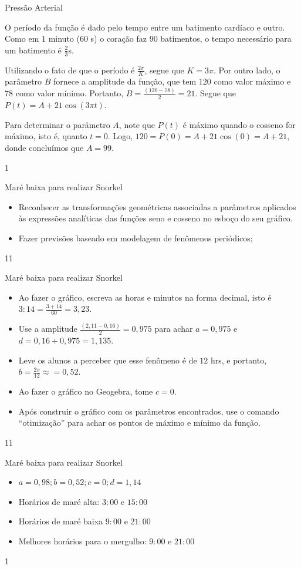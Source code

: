 \clearpage
\def\currentcolor{session2}
\marginpar{\vspace{.5em}}
\begin{answer}{Pressão Arterial}
{
O período da função é dado pelo tempo entre um batimento cardíaco e outro. Como em $1$ minuto ($60$ s) o coração faz $90$ batimentos, o tempo necessário para um batimento é $\frac{2}{3}$s. 

Utilizando o fato de que o período é $\frac{2\pi}{K}$, segue que $K = 3\pi$. Por outro lado, o parâmetro $B$ fornece a amplitude da função, que tem $120$ como valor máximo e $78$ como valor mínimo. Portanto, $B =\frac{(120-78)}{2} = 21$. Segue que $P(t) = A + 21\cos(3\pi t)$.

Para determinar o parâmetro $A$, note que $P(t)$ é máximo quando o cosseno for máximo, isto é, quanto $t = 0$. Logo, $120 = P(0) = A + 21\cos(0) = A + 21$, donde concluímos que $A = 99$.
}{1}
\end{answer}
\begin{objectives}{Maré baixa para realizar Snorkel}
{
\begin{itemize}
\item  Reconhecer as transformações geométricas associadas a
parâmetros aplicados às expressões analíticas das funções
seno e cosseno no esboço do seu gráfico.
\item Fazer previsões baseado em modelagem de fenômenos
periódicos;
\end{itemize}
}{1}{1}
\end{objectives}
\begin{sugestions}{Maré baixa para realizar Snorkel}
{
\begin{itemize}
\item Ao fazer o gráfico, escreva as horas e minutos na forma decimal, isto é $3:14=\frac{3+14}{60}=3{,}23$.
\item Use a amplitude $\frac{(2{,}11-0{,}16)}{2}=0{,}975$ para achar $a=0{,}975$ e $d=0{,}16+0{,}975=1{,}135$.
\item Leve os alunos a perceber que esse fenômeno é de $12$ hrs, e
portanto, $b=\frac{2\pi}{12}\approx=0{,}52$.
\item Ao fazer o gráfico no Geogebra, tome $c=0$.
\item Após construir o gráfico com os parâmetros encontrados, use o comando “otimização”{} para achar os pontos de máximo e mínimo da função.
\end{itemize}
}{1}{1}
\end{sugestions}
\clearmargin
\begin{answer}{Maré baixa para realizar Snorkel}
{
\begin{itemize}
\item $a=0{,}98; b=0{,}52; c=0; d=1{,}14$
\item Horários de maré alta: $3{:}00$ e $15{:}00$
\item Horários de maré baixa $9{:}00$ e $21{:}00$
\item Melhores horários para o mergulho: $9{:}00$ e $21{:}00$
\end{itemize}
}{1}
\end{answer}


